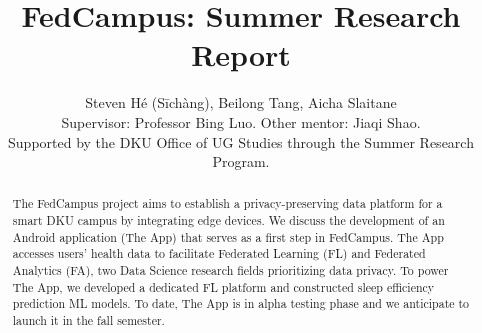 \documentclass{article}
\title{FedCampus: Summer Research Report}
\author{
    Steven Hé (Sīchàng), Beilong Tang, Aicha Slaitane\\
    Supervisor: Professor Bing Luo. Other mentor: Jiaqi Shao.\\
    Supported by the DKU Office of UG Studies through the Summer Research
    Program.
}
\begin{document}
\maketitle

\begin{abstract}
The FedCampus project aims to establish a privacy-preserving data
platform for a smart DKU campus by integrating edge devices. We discuss
the development of an Android application (The App) that serves as a
first step in FedCampus. The App accesses users' health
data to facilitate Federated Learning (FL) and Federated Analytics (FA),
two Data Science research fields prioritizing data privacy. To power The
App, we developed a dedicated FL platform and constructed sleep
efficiency prediction ML models. To date, The App is in alpha testing
phase and we anticipate to launch it in the fall semester.
\end{abstract}
\end{document}
